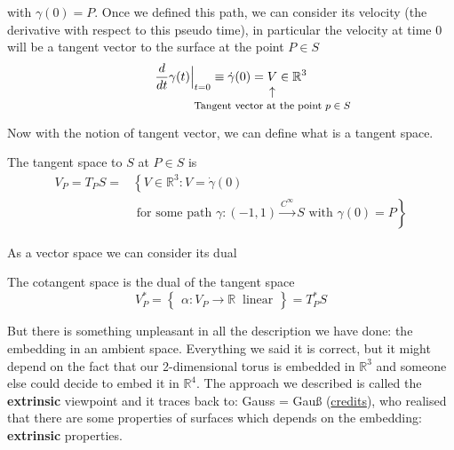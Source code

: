 \documentclass[../main.tex]{subfiles}
\begin{document}
with $\gamma(0)=P$. Once we defined this path, we can consider its velocity (the derivative with respect to this pseudo time), in particular the velocity at time $0$ will be a tangent vector to the surface at the point $P\in S$
\[
\frac{d}{dt}\gamma(t)\Bigr|_{\substack{t=0}}\equiv\Dot{\gamma}(0)=\underset{\mathclap{\tikz \node {$\uparrow$} node [below=1ex] {\footnotesize Tangent vector at the point $p\in S$};}}{V}\in\mathbb{R}^3
\]
Now with the notion of tangent vector, we can define what is a tangent space.
\begin{definition}
The tangent space to $S$ at $P\in S$ is
\begin{align*}
V_P=T_P S=&\left\{V\in \mathbb{R}^3: V=\Dot{\gamma}(0)\right.\\ 
&\left.\textrm{ for some path } \gamma: (-1,1)\xrightarrow{C^\infty} S \mbox{ with } \gamma(0)=P\right\}
\end{align*}
\end{definition}
As a vector space we can consider its dual
\begin{definition}
The cotangent space is the dual of the tangent space
\[
V_P^*=\begin{Bmatrix}\alpha:V_P \rightarrow \mathbb{R} \ \mbox{ linear}\end{Bmatrix}=T_P^* S
\]
\end{definition}
But there is something unpleasant in all the description we have done: the embedding in an ambient space. Everything we said it is correct, but it might depend on the fact that our 2-dimensional torus is embedded in $\mathbb{R}^3$ and someone else could decide to embed it in $\mathbb{R}^4$. The approach we described is called the \textbf{extrinsic} viewpoint and it traces back to: Gauss = Gauß (\underline{credits}), who realised that there are some properties of surfaces which depends on the embedding: \textbf{extrinsic} properties.
\end{document}
